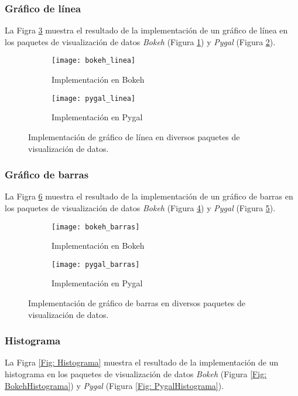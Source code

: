 \subsubsection{Gráfico de línea}
La Figra \ref{Fig: Linea} muestra el resultado de la implementación de un gráfico de línea en los paquetes de visualización de datos \emph{Bokeh} (Figura \ref{Fig: BokehLinea}) y \emph{Pygal} (Figura \ref{Fig: PygalLinea}).

\begin{figure}[!htb]
	\centering
	\begin{subfigure}[b]{0.4\textwidth}
		\centering
		\texttt{[image: bokeh\_linea]}
		\caption{Implementación en Bokeh}
		\label{Fig: BokehLinea}
	\end{subfigure}
	\begin{subfigure}[b]{0.4\textwidth}
		\centering
		\texttt{[image: pygal\_linea]}
		\caption{Implementación en Pygal}
		\label{Fig: PygalLinea}
	\end{subfigure}
	\caption{Implementación de gráfico de línea en diversos paquetes de visualización de datos.}
	\label{Fig: Linea}
\end{figure}

\subsubsection{Gráfico de barras}
La Figra \ref{Fig: Barras} muestra el resultado de la implementación de un gráfico de barras en los paquetes de visualización de datos \emph{Bokeh} (Figura \ref{Fig: BokehBarras}) y \emph{Pygal} (Figura \ref{Fig: PygalBarras}).

\begin{figure}[!htb]
	\centering
	\begin{subfigure}[b]{0.4\textwidth}
		\centering
		\texttt{[image: bokeh\_barras]}
		\caption{Implementación en Bokeh}
		\label{Fig: BokehBarras}
	\end{subfigure}
	\begin{subfigure}[b]{0.4\textwidth}
		\centering
		\texttt{[image: pygal\_barras]}
		\caption{Implementación en Pygal}
		\label{Fig: PygalBarras}
	\end{subfigure}
	\caption{Implementación de gráfico de barras en diversos paquetes de visualización de datos.}
	\label{Fig: Barras}
\end{figure}

\newpage

\subsubsection{Histograma}
La Figra \ref{Fig: Histograma} muestra el resultado de la implementación de un histograma en los paquetes de visualización de datos \emph{Bokeh} (Figura \ref{Fig: BokehHistograma}) y \emph{Pygal} (Figura \ref{Fig: PygalHistograma}).

